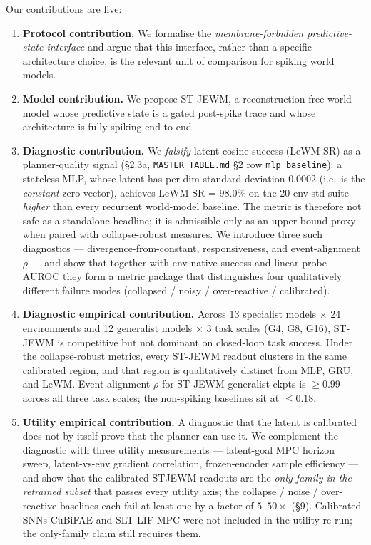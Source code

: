 \documentclass{article}
\begin{document}
Our contributions are five:

\begin{enumerate}
\item \textbf{Protocol contribution.} We formalise the \emph{membrane-forbidden predictive-state interface} and argue that this interface, rather than a specific architecture choice, is the relevant unit of comparison for spiking world models.
\item \textbf{Model contribution.} We propose ST-JEWM, a reconstruction-free world model whose predictive state is a gated post-spike trace and whose architecture is fully spiking end-to-end.
\item \textbf{Diagnostic contribution.} We \emph{falsify} latent cosine success (LeWM-SR) as a planner-quality signal (\S2.3a, \texttt{MASTER\_TABLE.md} \S2 row \texttt{mlp\_baseline}): a stateless MLP, whose latent has per-dim standard deviation $0.0002$ (i.e.\ is the \emph{constant} zero vector), achieves LeWM-SR = $98.0\%$ on the 20-env std suite --- \emph{higher} than every recurrent world-model baseline. The metric is therefore not safe as a standalone headline; it is admissible only as an upper-bound proxy when paired with collapse-robust measures. We introduce three such diagnostics --- divergence-from-constant, responsiveness, and event-alignment $\rho$ --- and show that together with env-native success and linear-probe AUROC they form a metric package that distinguishes four qualitatively different failure modes (collapsed / noisy / over-reactive / calibrated).
\item \textbf{Diagnostic empirical contribution.} Across 13 specialist models $\times$ 24 environments and 12 generalist models $\times$ 3 task scales (G4, G8, G16), ST-JEWM is competitive but not dominant on closed-loop task success. Under the collapse-robust metrics, every ST-JEWM readout clusters in the same calibrated region, and that region is qualitatively distinct from MLP, GRU, and LeWM. Event-alignment $\rho$ for ST-JEWM generalist ckpts is $\geq 0.99$ across all three task scales; the non-spiking baselines sit at $\leq 0.18$.
\item \textbf{Utility empirical contribution.} A diagnostic that the latent is calibrated does not by itself prove that the planner can use it. We complement the diagnostic with three utility measurements --- latent-goal MPC horizon sweep, latent-vs-env gradient correlation, frozen-encoder sample efficiency --- and show that the calibrated STJEWM readouts are the \emph{only family in the retrained subset} that passes every utility axis; the collapse / noise / over-reactive baselines each fail at least one by a factor of $5$--$50\times$ (\S9). Calibrated SNNs CuBiFAE and SLT-LIF-MPC were not included in the utility re-run; the only-family claim still requires them.
\end{enumerate}
\end{document}

